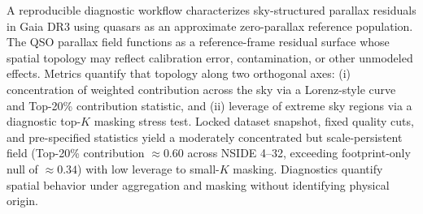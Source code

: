 A reproducible diagnostic workflow characterizes sky-structured parallax residuals in Gaia DR3 using quasars as an approximate zero-parallax reference population. The QSO parallax field functions as a reference-frame residual surface whose spatial topology may reflect calibration error, contamination, or other unmodeled effects. Metrics quantify that topology along two orthogonal axes: (i) concentration of weighted contribution across the sky via a Lorenz-style curve and Top-20\% contribution statistic, and (ii) leverage of extreme sky regions via a diagnostic top-$K$ masking stress test. Locked dataset snapshot, fixed quality cuts, and pre-specified statistics yield a moderately concentrated but scale-persistent field (Top-20\% contribution $\approx 0.60$ across NSIDE 4--32, exceeding footprint-only null of $\approx 0.34$) with low leverage to small-$K$ masking. Diagnostics quantify spatial behavior under aggregation and masking without identifying physical origin.

